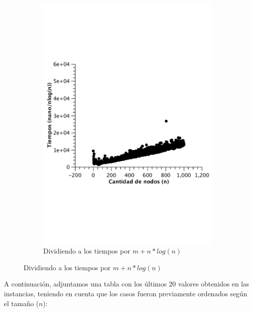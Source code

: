 \begin{figure}[H]
        \begin{subfigure}[b]{0.45\textwidth}
                \includegraphics[width=\textwidth]{imagenes/vacio-matriz-4.pdf}
                \caption{Dividiendo a los tiempos por $m + n*log(n)$}
        \end{subfigure}
\end{figure}

A continuación, adjuntamos una tabla con los últimos 20 valores obtenidos en las instancias, teniendo en cuenta que los casos fueron previamente ordenados según el tamaño ($n$):

